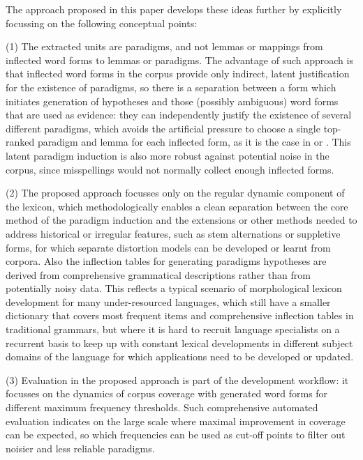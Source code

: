 \documentclass[11pt,a4paper]{article}
\begin{document}
The approach proposed in this paper develops these ideas further by explicitly focussing on the following conceptual points:

(1) The extracted units are paradigms, and not lemmas or mappings from inflected word forms to lemmas or paradigms. The advantage of such approach is that inflected word forms in the corpus provide only indirect, latent justification for the existence of paradigms, so there is a separation between a form which initiates generation of hypotheses and those (possibly ambiguous) word forms that are used as evidence: they can independently justify the existence of several different paradigms, which avoids the artificial pressure to choose a single top-ranked paradigm and lemma for each inflected form, as it is the case in \cite{oliver2004enlarging} or \cite{hulden2014semi}. This latent paradigm induction is also more robust against potential noise in the corpus, since misspellings would not normally collect enough inflected forms.

(2) The proposed approach focusses only on the regular dynamic component of the lexicon, which methodologically enables a clean separation between the core method of the paradigm induction and the extensions or other methods needed to address historical or irregular features, such as stem alternations or suppletive forms, for which separate distortion models can be developed or learnt from corpora. Also the inflection tables for generating paradigms hypotheses are derived from comprehensive grammatical descriptions rather than from potentially noisy data. This reflects a typical scenario of morphological lexicon development for many under-resourced languages, which still have a smaller dictionary that covers most frequent items and comprehensive inflection tables in traditional grammars, but where it is hard to recruit language specialists on a recurrent basis to keep up with constant lexical developments in different subject domains of the language for which applications need to be developed or updated.

(3) Evaluation in the proposed approach is part of the development workflow: it focusses on the dynamics of corpus coverage with generated word forms for different maximum frequency thresholds. Such comprehensive automated evaluation indicates on the large scale where maximal improvement in coverage can be expected, so which frequencies can be used as cut-off points to filter out noisier and less reliable paradigms.
\end{document}
